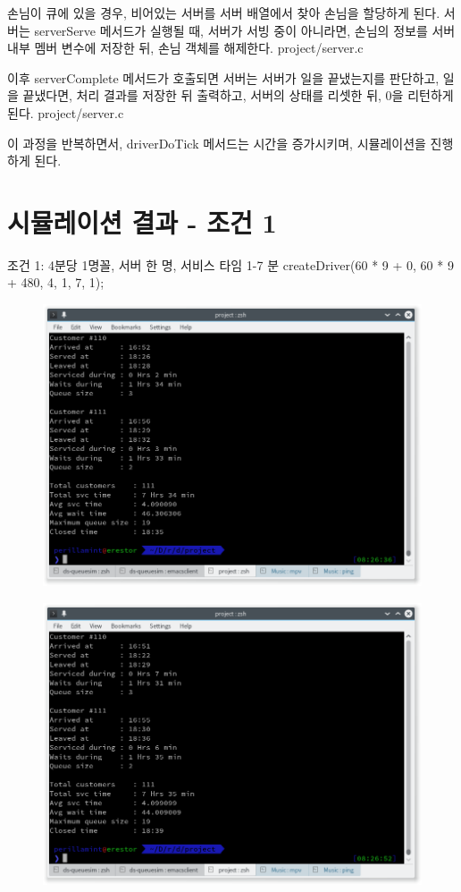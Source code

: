 \documentclass {article}
\begin{document}
{{손님이 큐에 있을 경우, 비어있는 서버를 서버 배열에서 찾아 손님을 할당하게 된다. 서버는 serverServe 메서드가 실행될 때, 서버가 서빙 중이 아니라면, 손님의 정보를 서버 내부 멤버 변수에 저장한 뒤, 손님 객체를 해제한다.
{project/server.c}

이후 serverComplete 메서드가 호출되면 서버는 서버가 일을 끝냈는지를 판단하고, 일을 끝냈다면, 처리 결과를 저장한 뒤 출력하고, 서버의 상태를 리셋한 뒤, 0을 리턴하게 된다.
{project/server.c}

이 과정을 반복하면서, driverDoTick 메서드는 시간을 증가시키며, 시뮬레이션을 진행하게 된다.

\newpage
\section {시뮬레이션 결과 - 조건 1}
조건 1: 4분당 1명꼴, 서버 한 명, 서비스 타임 1-7 분\newline
createDriver(60 * 9 + 0, 60 * 9 + 480, 4, 1, 7, 1);

\begin {figure}[h!]
  \centering
  \includegraphics [width=120mm]{queuesim.png}
  \caption {}
  \label{fig:dmesg}
\end {figure}

\begin {figure}[h!]
  \centering
  \includegraphics [width=120mm]{queuesim1.png}
  \caption {}
  \label{fig:dmesg}
\end {figure}

}}
\end{document}
